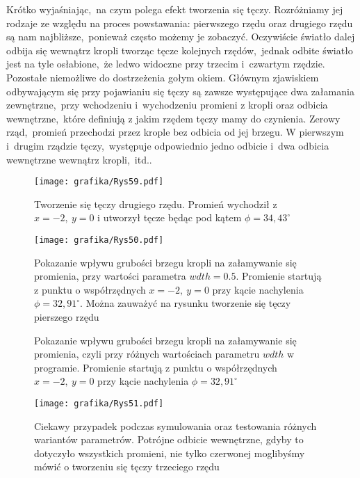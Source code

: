 Krótko wyjaśniając,~na czym polega efekt tworzenia się tęczy. Rozróżniamy jej rodzaje ze względu na proces powstawania: pierwszego rzędu oraz drugiego rzędu są nam najbliższe,~ponieważ często możemy je zobaczyć. Oczywiście światło dalej odbija się wewnątrz kropli tworząc tęcze kolejnych rzędów,~jednak odbite światło jest na tyle osłabione,~że ledwo widoczne przy trzecim i~czwartym rzędzie. Pozostałe niemożliwe do dostrzeżenia gołym okiem.  Głównym zjawiskiem odbywającym się przy pojawianiu się tęczy są zawsze występujące dwa załamania zewnętrzne,~przy wchodzeniu i~wychodzeniu promieni z kropli oraz odbicia wewnętrzne,~które definiują z jakim rzędem tęczy mamy do czynienia. Zerowy rząd,~promień przechodzi przez krople bez odbicia od jej brzegu. W pierwszym i~drugim rządzie tęczy,~występuje odpowiednio jedno odbicie i~dwa odbicia wewnętrzne wewnątrz kropli,~itd..
\begin{figure}[H]
    \centering
    \texttt{[image: grafika/Rys59.pdf]}
    \caption{Tworzenie się tęczy drugiego rzędu. Promień wychodził z $x=-2,~y=0$ i utworzył tęcze będąc pod kątem $\phi=34,43^{\circ}$}
\end{figure}
\begin{figure}[H]
    \centering
    \texttt{[image: grafika/Rys50.pdf]}
    \caption{Pokazanie wpływu grubości brzegu kropli na załamywanie się promienia, przy wartości parametra $wdth=0.5$. Promienie startują z punktu o współrzędnych $x=-2,~y=0$ przy kącie nachylenia $\phi=32,91^{\circ}$. Można zauważyć na rysunku tworzenie się tęczy pierszego rzędu}
\end{figure}
\begin{figure}[H]
   \centering
    \caption{Pokazanie wpływu grubości brzegu kropli na załamywanie się promienia, czyli przy różnych wartościach parametru $wdth$ w programie. Promienie startują z punktu o współrzędnych $x=-2,~y=0$ przy kącie nachylenia $\phi=32,91^{\circ}$}
\end{figure}
\begin{figure}[H]
    \centering
    \texttt{[image: grafika/Rys51.pdf]}
    \caption{Ciekawy przypadek podczas symulowania oraz testowania różnych wariantów parametrów. Potrójne odbicie wewnętrzne, gdyby to dotyczyło wszystkich promieni, nie tylko czerwonej moglibyśmy mówić o tworzeniu się tęczy trzeciego rzędu}
\end{figure}
